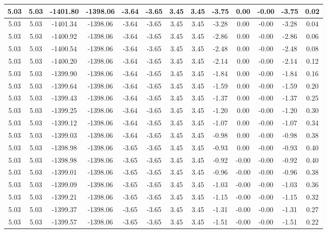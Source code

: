 \begin{table}[htbp]
\begin{adjustbox}{angle=90}
\begin{tabular}{|c|c|c|c|c|c|c|c|c|c|c|c|c|}
 5.03 & 5.03 & -1401.80 & -1398.06 & -3.64 & -3.65 & 3.45 & 3.45 & -3.75 & 0.00 & -0.00 & -3.75 & 0.02\\ \hline
 5.03 & 5.03 & -1401.34 & -1398.06 & -3.64 & -3.65 & 3.45 & 3.45 & -3.28 & 0.00 & -0.00 & -3.28 & 0.04\\ \hline
 5.03 & 5.03 & -1400.92 & -1398.06 & -3.64 & -3.65 & 3.45 & 3.45 & -2.86 & 0.00 & -0.00 & -2.86 & 0.06\\ \hline
 5.03 & 5.03 & -1400.54 & -1398.06 & -3.64 & -3.65 & 3.45 & 3.45 & -2.48 & 0.00 & -0.00 & -2.48 & 0.08\\ \hline
 5.03 & 5.03 & -1400.20 & -1398.06 & -3.64 & -3.65 & 3.45 & 3.45 & -2.14 & 0.00 & -0.00 & -2.14 & 0.12\\ \hline
 5.03 & 5.03 & -1399.90 & -1398.06 & -3.64 & -3.65 & 3.45 & 3.45 & -1.84 & 0.00 & -0.00 & -1.84 & 0.16\\ \hline
 5.03 & 5.03 & -1399.64 & -1398.06 & -3.64 & -3.65 & 3.45 & 3.45 & -1.59 & 0.00 & -0.00 & -1.59 & 0.20\\ \hline
 5.03 & 5.03 & -1399.43 & -1398.06 & -3.64 & -3.65 & 3.45 & 3.45 & -1.37 & 0.00 & -0.00 & -1.37 & 0.25\\ \hline
 5.03 & 5.03 & -1399.25 & -1398.06 & -3.64 & -3.65 & 3.45 & 3.45 & -1.20 & 0.00 & -0.00 & -1.20 & 0.30\\ \hline
 5.03 & 5.03 & -1399.12 & -1398.06 & -3.64 & -3.65 & 3.45 & 3.45 & -1.07 & 0.00 & -0.00 & -1.07 & 0.34\\ \hline
 5.03 & 5.03 & -1399.03 & -1398.06 & -3.64 & -3.65 & 3.45 & 3.45 & -0.98 & 0.00 & -0.00 & -0.98 & 0.38\\ \hline
 5.03 & 5.03 & -1398.98 & -1398.06 & -3.65 & -3.65 & 3.45 & 3.45 & -0.93 & 0.00 & -0.00 & -0.93 & 0.40\\ \hline
 5.03 & 5.03 & -1398.98 & -1398.06 & -3.65 & -3.65 & 3.45 & 3.45 & -0.92 & -0.00 & -0.00 & -0.92 & 0.40\\ \hline
 5.03 & 5.03 & -1399.01 & -1398.06 & -3.65 & -3.65 & 3.45 & 3.45 & -0.96 & -0.00 & -0.00 & -0.96 & 0.38\\ \hline
 5.03 & 5.03 & -1399.09 & -1398.06 & -3.65 & -3.65 & 3.45 & 3.45 & -1.03 & -0.00 & -0.00 & -1.03 & 0.36\\ \hline
 5.03 & 5.03 & -1399.21 & -1398.06 & -3.65 & -3.65 & 3.45 & 3.45 & -1.15 & -0.00 & -0.00 & -1.15 & 0.32\\ \hline
 5.03 & 5.03 & -1399.37 & -1398.06 & -3.65 & -3.65 & 3.45 & 3.45 & -1.31 & -0.00 & -0.00 & -1.31 & 0.27\\ \hline
 5.03 & 5.03 & -1399.57 & -1398.06 & -3.65 & -3.65 & 3.45 & 3.45 & -1.51 & -0.00 & -0.00 & -1.51 & 0.22\\ \hline

\end{tabular}
\end{adjustbox}
\end{table}
